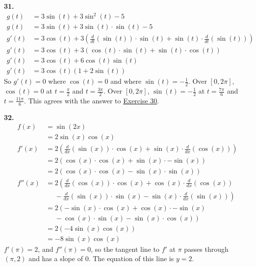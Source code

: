 \documentclass[10pt,oneside,]{book}
\theoremstyle{plain}
\theoremstyle{definition}
\numberwithin{equation}{section}
\newcommand{\fe}[2]{#1\mathopen{}\left(#2\right)\mathclose{}}
\newcommand{\cinterval}[2]{\left[#1,#2\right]}
\newcommand{\point}[2]{\left(#1,#2\right)}
\newcommand{\fd}[1]{#1'}
\newcommand{\sd}[1]{#1''}
\newcommand{\lzoo}[2]{{\frac{d}{d#1}}{\left(#2\right)}}
\begin{document}
\noindent\textbf{31.}\quad{}\begin{align*}
\fe{g}{t}&=3\fe{\sin}{t}+3\fe{\sin^2}{t}-5\\
\fe{g}{t}&=3\fe{\sin}{t}+3\fe{\sin}{t}\cdot\fe{\sin}{t}-5\\
\fe{\fd{g}}{t}&=3\fe{\cos}{t}+3\left(\lzoo{t}{\fe{\sin}{t}}\cdot\fe{\sin}{t}+\fe{\sin}{t}\cdot\lzoo{t}{\fe{\sin}{t}}\right)\\
\fe{\fd{g}}{t}&=3\fe{\cos}{t}+3\left(\fe{\cos}{t}\cdot\fe{\sin}{t}+\fe{\sin}{t}\cdot\fe{\cos}{t}\right)\\
\fe{\fd{g}}{t}&=3\fe{\cos}{t}+6\fe{\cos}{t}\fe{\sin}{t}\\
\fe{\fd{g}}{t}&=3\fe{\cos}{t}\left(1+2\fe{\sin}{t}\right)
\end{align*}So \(\fe{\fd{g}}{t}=0\) where \(\fe{\cos}{t}=0\) and where \(\fe{\sin}{t}=-\frac{1}{2}\). Over \(\cinterval{0}{2\pi}\), \(\fe{\cos}{t}=0\) at \(t=\frac{\pi}{2}\) and \(t=\frac{3\pi}{2}\). Over \(\cinterval{0}{2\pi}\), \(\fe{\sin}{t}=-\frac{1}{2}\) at \(t=\frac{7\pi}{6}\) and \(t=\frac{11\pi}{6}\). This agrees with the answer to \hyperlink{exercise-second-analyze-intervals-supplement-first}{Exercise 30}.%
\par\smallskip
\noindent\textbf{32.}\quad{}\begin{align*}
\fe{f}{x}&=\fe{\sin}{2x}\\
&=2\fe{\sin}{x}\fe{\cos}{x}\\
\fe{\fd{f}}{x}&=2\left(\lzoo{x}{\fe{\sin}{x}}\cdot\fe{\cos}{x}+\fe{\sin}{x}\cdot\lzoo{x}{\fe{\cos}{x}}\right)\\
&=2\left(\fe{\cos}{x}\cdot\fe{\cos}{x}+\fe{\sin}{x}\cdot-\fe{\sin}{x}\right)\\
&=2\left(\fe{\cos}{x}\cdot\fe{\cos}{x}-\fe{\sin}{x}\cdot\fe{\sin}{x}\right)\\
\fe{\sd{f}}{x}&=2\left(\lzoo{x}{\fe{\cos}{x}}\cdot\fe{\cos}{x}+\fe{\cos}{x}\cdot\lzoo{x}{\fe{\cos}{x}}\right.\\
&\phantom{{}={}}\left.{}-\lzoo{x}{\fe{\sin}{x}}\cdot\fe{\sin}{x}-\fe{\sin}{x}\cdot\lzoo{x}{\fe{\sin}{x}}\right)\\
&=2\left(-\fe{\sin}{x}\cdot\fe{\cos}{x}+\fe{\cos}{x}\cdot-\fe{\sin}{x}\right.\\
&\phantom{{}={}}\left.{}-\fe{\cos}{x}\cdot\fe{\sin}{x}-\fe{\sin}{x}\cdot\fe{\cos}{x}\right)\\
&=2\left(-4\fe{\sin}{x}\fe{\cos}{x}\right)\\
&=-8\fe{\sin}{x}\fe{\cos}{x}
\end{align*}\(\fe{\fd{f}}{\pi}=2\), and \(\fe{\sd{f}}{\pi}=0\), so the tangent line to \(\fd{f}\) at \(\pi\) passes through \(\point{\pi}{2}\) and has a slope of \(0\). The equation of this line is \(y=2\).%
\end{document}
